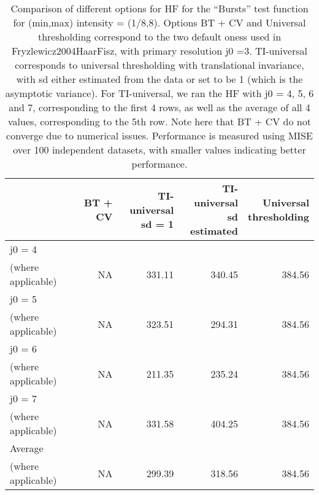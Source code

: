 \documentclass[12pt]{article}
\begin{document}
\begin{table}[ht]
\centering
\begin{tabular}{lrrrr}
  \hline
 & BT + CV & \pbox{20cm}{TI-universal \\ sd = 1} & \pbox{20cm}{TI-universal \\ sd estimated} & \pbox{20cm}{Universal \\ thresholding} \\ 
  \hline
j0 = 4 \\
 (where applicable) & NA & 331.11 & 340.45 & 384.56 \\ 
  j0 = 5 \\
 (where applicable) & NA & 323.51 & 294.31 & 384.56 \\ 
  j0 = 6 \\
 (where applicable) & NA & 211.35 & 235.24 & 384.56 \\ 
  j0 = 7 \\
 (where applicable) & NA & 331.58 & 404.25 & 384.56 \\ 
  Average \\
 (where applicable) & NA & 299.39 & 318.56 & 384.56 \\ 
   \hline
\end{tabular}
\caption{Comparison of different options for HF for the ``Bursts'' test function for (min,max) intensity = (1/8,8). Options BT + CV and Universal thresholding correspond to the two default oness used in {Fryzlewicz2004HaarFisz}, with primary resolution j0 =3. TI-universal corresponds to universal thresholding with translational invariance, with sd either estimated from the data or set to be 1 (which is the asymptotic variance). For TI-universal, we ran the HF with j0 = 4, 5, 6 and 7, corresponding to the first 4 rows, as well as the average of all 4 values, corresponding to the 5th row. Note here that BT + CV do not converge due to numerical issues. Performance is measured using MISE over 100 independent datasets, with smaller values indicating better performance.} 
\label{table:pois_hf_bur_8}
\end{table}
\end{document}
